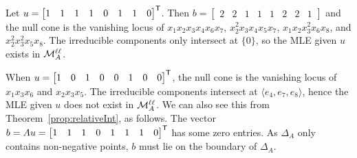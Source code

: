 \begin{example}
	Let $u = \begin{bmatrix} 1 & 1 & 1 & 1 & 0 & 1 & 1 & 0 \end{bmatrix}^{\mathsf{T}}$. Then $b = \begin{bmatrix} 2 & 2 & 1 & 1 & 1 & 2 & 2 & 1\end{bmatrix}$ and the null cone is the vanishing locus of
	$x_1 x_2 x_3 x_4 x_6 x_7$,
	$x_2^2 x_3 x_4 x_5 x_7$, 
	$x_1 x_2 x_3^2 x_6 x_8$, and 
	$x_2^2 x_3^2 x_5 x_8$.
	The irreducible components only intersect at $\{ 0 \}$, so the MLE given $u$ exists in $\mathcal{M}^{\mathtt{\ell \ell}}_A$. 
	
	When $u = \begin{bmatrix} 1 & 0 & 1 & 0 & 0 & 1 & 0 & 0 \end{bmatrix}^{\mathsf{T}}$, the null cone is the vanishing locus of
	$x_1 x_3 x_6$ and $x_2 x_3 x_5$. 
	The irreducible components intersect at $\langle e_4, e_7, e_8 \rangle$, hence the MLE given $u$ does not exist in $\mathcal{M}^{\mathtt{\ell \ell}}_A$. We can also see this from Theorem~\ref{prop:relativeInt}, as follows. The vector $b = Au = \begin{bmatrix} 1 & 1 & 1 & 0 & 1 & 1 & 1 & 0 \end{bmatrix}^{\mathsf{T}}$ has some zero entries. As $\Delta_A$ only contains non-negative points, $b$ must lie on the boundary of $\Delta_A$.
	\hfill\exSymbol
\end{example}








